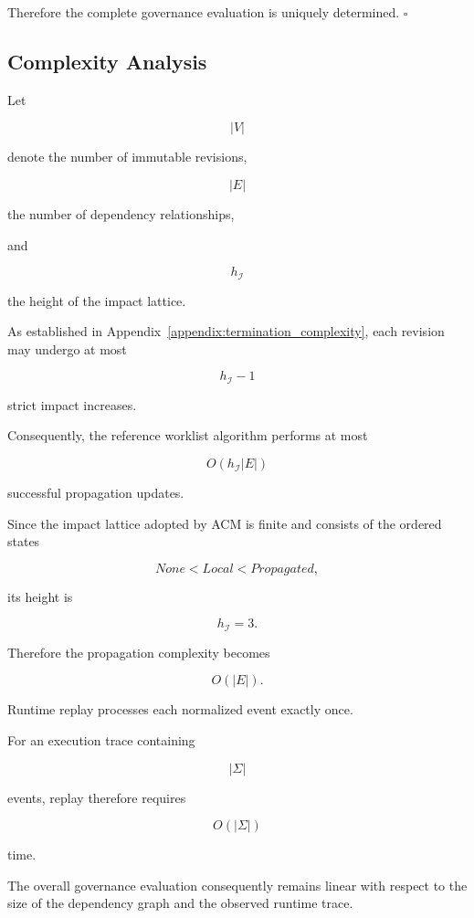 \documentclass[10pt]{article}
\begin{document}
Therefore the complete governance evaluation is uniquely determined.
\hfill$\square$

\subsection{Complexity Analysis}
\label{appendix:complexity_analysis}

Let

\[
|V|
\]

denote the number of immutable revisions,

\[
|E|
\]

the number of dependency relationships,

and

\[
h_{\mathcal I}
\]

the height of the impact lattice.

As established in Appendix~\ref{appendix:termination_complexity},
each revision may undergo at most

\[
h_{\mathcal I}-1
\]

strict impact increases.

Consequently, the reference worklist algorithm performs at most

\[
O(h_{\mathcal I}|E|)
\]

successful propagation updates.

Since the impact lattice adopted by ACM is finite and consists of the ordered
states

\[
None
<
Local
<
Propagated,
\]

its height is

\[
h_{\mathcal I}=3.
\]

Therefore the propagation complexity becomes

\[
O(|E|).
\]

Runtime replay processes each normalized event exactly once.

For an execution trace containing

\[
|\Sigma|
\]

events, replay therefore requires

\[
O(|\Sigma|)
\]

time.

The overall governance evaluation consequently remains linear with respect to
the size of the dependency graph and the observed runtime trace.

\end{document}
